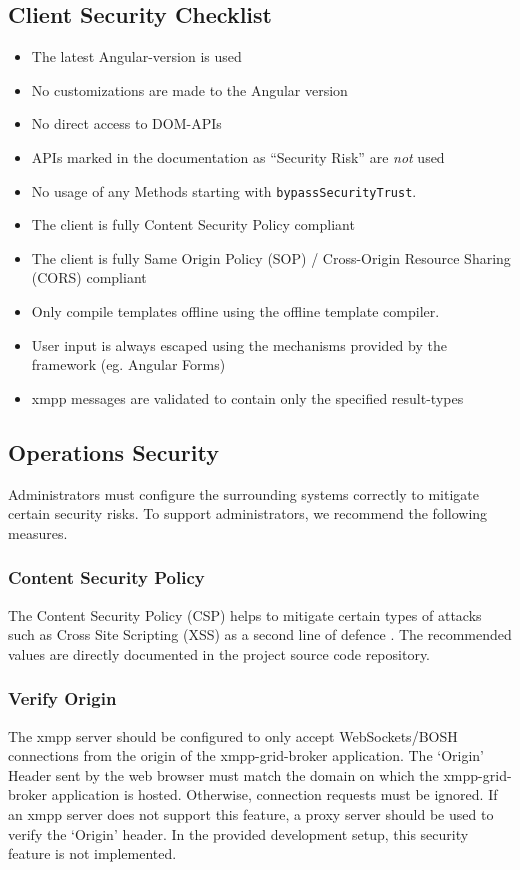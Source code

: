 \subsection{Client Security Checklist}
\begin{itemize}
    \item The latest Angular-version is used
    \item No customizations are made to the Angular version
    \item No direct access to DOM-APIs
    \item APIs marked in the documentation as ``Security Risk'' are \emph{not} used
    \item No usage of any Methods starting with \texttt{bypassSecurityTrust}.
    \item The client is fully Content Security Policy compliant
    \item The client is fully Same Origin Policy (SOP) / Cross-Origin Resource Sharing (CORS) compliant
    \item Only compile templates offline using the offline template compiler.
    \item User input is always escaped using the mechanisms provided by the framework (eg. Angular Forms)
    \item \gls{xmpp} \glspl{message} are validated to contain only the specified result-types
\end{itemize}

\subsection{Operations Security}\label{sec:ops-security}


Administrators must configure the surrounding systems correctly to mitigate certain security risks.
To support administrators, we recommend the following measures.

\subsubsection{Content Security Policy}

The Content Security Policy (CSP) helps to mitigate certain types of attacks such as Cross Site Scripting (XSS) as a second line of defence \cite{w3c-csp}.
The recommended values are directly documented in the project source code repository.

\subsubsection{Verify Origin}
The \gls{xmpp} server should be configured to only accept WebSockets/BOSH connections from the origin of the \gls{xmpp-grid-broker} application.
The `Origin' Header sent by the web browser must match the domain on which the \gls{xmpp-grid-broker} application is hosted.
Otherwise, connection requests must be ignored.
If an \gls{xmpp} server does not support this feature, a proxy server should be used to verify the `Origin' header.
In the provided development setup, this security feature is not implemented.
